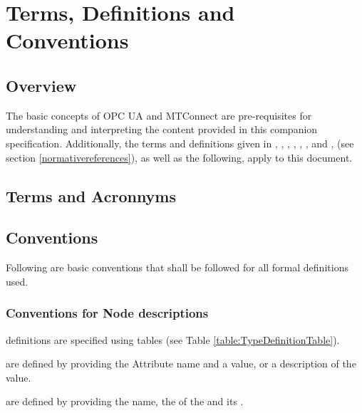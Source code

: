 \section{Terms, Definitions and Conventions}\label{termsdefinitionsconventions}

\subsection{Overview}

The basic concepts of OPC UA and MTConnect are pre-requisites for understanding and interpreting the content provided in this companion specification. Additionally, the terms and definitions given in \cite{UAPart1}, \cite{UAPart2}, \cite{UAPart3}, \cite{UAPart5}, \cite{UAPart7}, \cite{UAPart10}, and \cite{MTCPart1}, (see section \ref{normativereferences}), as well as the following, apply to this document. 

\subsection{Terms and Acronnyms}

\printglossary[type=opc]

\printglossary[type=mtc]

\printacronyms  

\subsection{Conventions}\label{conventions}
Following are basic conventions that shall be followed for all formal definitions used.

\subsubsection{Conventions for Node descriptions}

 definitions are specified using tables (see Table \ref{table:TypeDefinitionTable}).

 are defined by providing the Attribute name and a value, or a description of the value.

 are defined by providing the  name, the  of the  and its .


